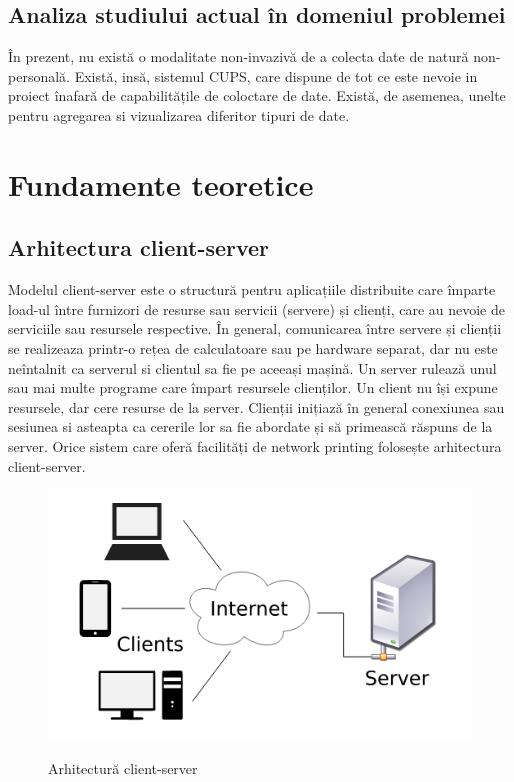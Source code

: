 \documentclass[a4paper, 12pt, twoside]{report}
\begin{document}
	\section{Analiza studiului actual în domeniul problemei}
În prezent, nu există o modalitate non-invazivă de a colecta date de natură non-personală. Există, insă, sistemul CUPS, care dispune de tot ce este nevoie in proiect înafară de capabilitățile de coloctare de date. Există, de asemenea, unelte pentru agregarea si vizualizarea diferitor tipuri de date.

\chapter{Fundamente teoretice}

	\section{Arhitectura client-server}
Modelul client-server este o structură pentru aplicațiile distribuite care împarte load-ul între furnizori de resurse sau servicii (servere) și clienți, care au nevoie de serviciile sau resursele respective. În general, comunicarea între servere și clienții se realizeaza printr-o rețea de calculatoare sau pe hardware separat, dar nu este neîntalnit ca serverul si clientul sa fie pe aceeași mașină. Un server rulează unul sau mai multe programe care împart resursele clienților. Un client nu își expune resursele, dar cere resurse de la server. Clienții inițiază în general conexiunea sau sesiunea si asteapta ca cererile lor sa fie abordate și să primească răspuns de la server. Orice sistem care oferă facilități de network printing folosește arhitectura client-server.

\begin{figure}[h]
		\centering
			{\includegraphics[width=120mm]{arch.png}}
		\caption{Arhitectură client-server}
\end{figure}
\end{document}
